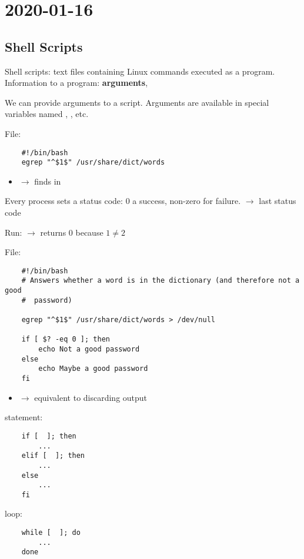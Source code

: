\section{2020-01-16}
\subsection{Shell Scripts}
Shell scripts: text files containing Linux commands executed as a program.
Information to a program: \textbf{arguments}, 

We can provide arguments to a script. Arguments are available in special
variables named , , etc.

File: 
\begin{lstlisting}
    #!/bin/bash
    egrep "^$1$" /usr/share/dict/words
\end{lstlisting}
\begin{itemize}
      \item {} $ \rightarrow $ finds  in
\end{itemize}

Every process sets a status code: $ 0 $ a success, non-zero for failure.
 $ \rightarrow $ last status code

Run: \code{[ 1 -eq 2]}  $ \rightarrow $ returns $ 0 $ because $ 1\neq 2 $

File: 
\begin{lstlisting}
    #!/bin/bash
    # Answers whether a word is in the dictionary (and therefore not a good
    #  password)

    egrep "^$1$" /usr/share/dict/words > /dev/null

    if [ $? -eq 0 ]; then
        echo Not a good password
    else
        echo Maybe a good password
    fi
\end{lstlisting}
\begin{itemize}
      \item {} $ \rightarrow $ equivalent to discarding output
\end{itemize}

 statement:
\begin{lstlisting}
    if [  ]; then
        ...
    elif [  ]; then
        ...
    else
        ...
    fi
\end{lstlisting}

 loop:
\begin{lstlisting}
    while [  ]; do
        ...
    done
\end{lstlisting}

